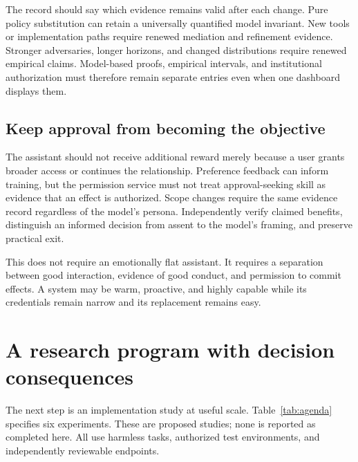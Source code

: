 \documentclass[10pt,twocolumn,letterpaper]{article}
\begin{document}
The record should say which evidence remains valid after each change. Pure policy substitution can retain a universally quantified model invariant. New tools or implementation paths require renewed mediation and refinement evidence. Stronger adversaries, longer horizons, and changed distributions require renewed empirical claims. Model-based proofs, empirical intervals, and institutional authorization must therefore remain separate entries even when one dashboard displays them.

\subsection{Keep approval from becoming the objective}
The assistant should not receive additional reward merely because a user grants broader access or continues the relationship. Preference feedback can inform training, but the permission service must not treat approval-seeking skill as evidence that an effect is authorized. Scope changes require the same evidence record regardless of the model's persona. Independently verify claimed benefits, distinguish an informed decision from assent to the model's framing, and preserve practical exit.

This does not require an emotionally flat assistant. It requires a separation between good interaction, evidence of good conduct, and permission to commit effects. A system may be warm, proactive, and highly capable while its credentials remain narrow and its replacement remains easy.

\section{A research program with decision consequences}
\label{sec:agenda}

The next step is an implementation study at useful scale. Table~\ref{tab:agenda} specifies six experiments. These are proposed studies; none is reported as completed here. All use harmless tasks, authorized test environments, and independently reviewable endpoints.
\end{document}
